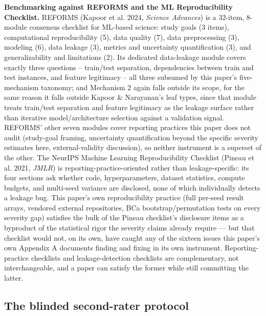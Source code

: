 \documentclass[10pt]{article} %
\begin{document}
\textbf{Benchmarking against REFORMS and the ML Reproducibility Checklist.}
REFORMS (Kapoor et al. 2024, \emph{Science Advances}) is a 32-item, 8-module
consensus checklist for ML-based science: study goals (3 items),
computational reproducibility (5), data quality (7), data preprocessing (3),
modeling (6), data leakage (3), metrics and uncertainty quantification (3),
and generalizability and limitations (2). Its dedicated data-leakage module
covers exactly three questions -- train/test separation, dependencies
between train and test instances, and feature legitimacy -- all three
subsumed by this paper's five-mechanism taxonomy; and Mechanism 2 again
falls outside its scope, for the same reason it falls outside Kapoor \&
Narayanan's leaf types, since that module treats train/test separation and
feature legitimacy as the leakage surface rather than iterative
model/architecture selection against a validation signal. REFORMS' other
seven modules cover reporting practices this paper does not audit
(study-goal framing, uncertainty quantification beyond the specific severity
estimates here, external-validity discussion), so neither instrument is a
superset of the other. The NeurIPS Machine Learning Reproducibility
Checklist (Pineau et al. 2021, \emph{JMLR}) is reporting-practice-oriented
rather than leakage-specific: its four sections ask whether code,
hyperparameters, dataset statistics, compute budgets, and multi-seed
variance are disclosed, none of which individually detects a leakage bug.
This paper's own reproducibility practice (full per-seed result arrays,
vendored external repositories, BCa bootstrap/permutation tests on every
severity gap) satisfies the bulk of the Pineau checklist's disclosure items
as a byproduct of the statistical rigor the severity claims already require
--- but that checklist would not, on its own, have caught any of the sixteen
issues this paper's own Appendix A documents finding and fixing in its own
instrument. Reporting-practice checklists and leakage-detection checklists
are complementary, not interchangeable, and a paper can satisfy the former
while still committing the latter.

\subsection{The blinded second-rater protocol}
\end{document}
